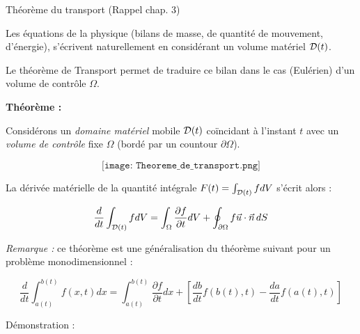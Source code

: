 \begin{frame}{Théorème du transport (Rappel chap. 3)}


\small

Les équations de la physique (bilans de masse, de quantité de mouvement, d'énergie), s'écrivent naturellement en considérant un volume matériel  ${\cal D} (t)$.

\smallskip

Le théorème de Transport permet de traduire ce bilan dans le cas (Eulérien) d'un volume de contrôle $\Omega$.



\smallskip

{\bf Théorème :} 


Considérons un {\em domaine matériel } mobile ${\cal D} (t)$ coïncidant à l'instant $t$ avec un {\em volume de contrôle } fixe $\Omega$ (bordé par un countour $\partial \Omega$).

$$
\texttt{[image: Theoreme\_de\_transport.png]}
$$



La dérivée matérielle de la quantité intégrale $F(t) =  \int_{{\cal D}(t)} f d V$ s'écrit alors  :

$$
\frac{d}{dt} \int_{{\cal D}(t)} f d V  = \int_\Omega \frac{\partial f } {\partial t} dV + \oint_{\partial\Omega} f\vec{u}\cdot\vec{n}\, dS
$$


\medskip
\pause









{\em Remarque :} ce théorème est une généralisation du théorème suivant pour un problème monodimensionnel :

$$
\frac{d}{dt} \int_{a(t)}^{b(t)} f(x,t) dx = \int_{a(t)}^{b(t)}  \frac{\partial f}{\partial t} d x + \left[ \frac{d b}{dt} f(b(t),t)  - \frac{d a}{dt} f(a(t),t) \right]
$$


{\color{green} Démonstration :}

\end{frame}


